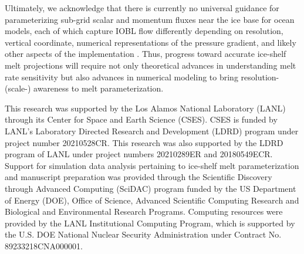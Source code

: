 \documentclass[tc, manuscript]{copernicus}
\begin{document}
Ultimately, we acknowledge that there is currently no universal guidance for parameterizing sub-grid scalar and momentum fluxes near the ice base for ocean models, each of which capture IOBL flow differently depending on resolution, vertical coordinate, numerical representations of the pressure gradient, and likely other aspects of the implementation \citep{gwyther_cold_2020}. Thus, progress toward accurate ice-shelf melt projections will require not only theoretical advances in understanding melt rate sensitivity but also advances in numerical modeling to bring resolution- (scale-) awareness to melt parameterization.




\begin{acknowledgements}
This research was supported by the Los Alamos National Laboratory (LANL) through its Center for Space and Earth Science (CSES). CSES is funded by LANL’s Laboratory Directed Research and Development (LDRD) program under project number 20210528CR. This research was also supported by the LDRD program of LANL under project numbers 20210289ER and 20180549ECR. Support for simulation data analysis pertaining to ice-shelf melt parameterization and manuscript preparation was provided through the Scientific Discovery through Advanced Computing (SciDAC) program funded by the US Department of Energy (DOE), Office of Science, Advanced Scientific Computing Research and Biological and Environmental Research Programs. Computing resources were provided by the LANL Institutional Computing Program, which is supported by the U.S. DOE National Nuclear Security Administration under Contract No. 89233218CNA000001. 
\end{acknowledgements}



\end{document}
